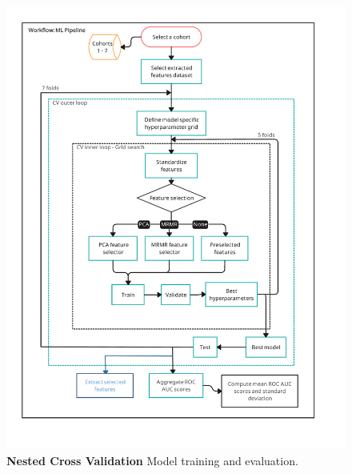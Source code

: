 \begin{figure}[!ht]
    \centering
    \includegraphics[width=\linewidth]{images/Workflow_ML_pipeline.pdf}
    \caption{{\bf Nested Cross Validation} Model training and evaluation.}
    \label{mlPipeline}
\end{figure}